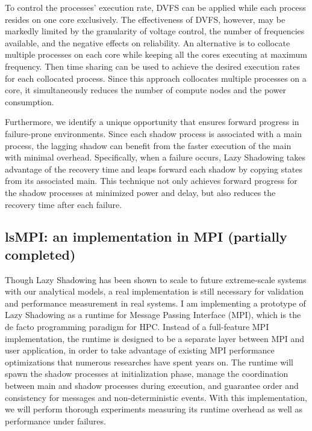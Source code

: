To control the processes' execution rate, DVFS can be applied while each process resides on one core exclusively. 
The effectiveness of DVFS, however, may be markedly 
limited by the granularity of voltage control, the number of frequencies available, and the negative effects on 
reliability. 
An alternative is to collocate multiple processes on each core while keeping all the cores executing at maximum frequency. 
Then time sharing can be used to achieve the desired execution rates for each collocated process. 
Since this approach collocates multiple processes on a core, it simultaneously reduces the number of compute nodes and 
the power consumption. 

Furthermore, we identify a unique opportunity that ensures forward progress in failure-prone environments. Since each shadow process is associated with a main process, the lagging shadow can benefit from the faster execution 
of the main with minimal overhead. Specifically, when a failure occurs, Lazy Shadowing takes advantage of 
the recovery time and leaps forward each shadow by copying states from its associated main. This technique not only achieves forward 
progress for the shadow processes at minimized power and delay, but also reduces the recovery time after each failure.

\subsection{lsMPI: an implementation in MPI (partially completed)}

Though Lazy Shadowing has been shown to scale to future extreme-scale systems with our analytical models, a real implementation 
is still necessary for validation and performance measurement in real systems. I am implementing a prototype of Lazy 
Shadowing as a runtime for Message Passing Interface (MPI), which is the de facto programming paradigm for HPC. Instead of 
a full-feature MPI implementation, the runtime is designed to be a separate layer between MPI and user application, in order 
to take advantage of existing MPI performance optimizations that numerous researches have spent years on. The runtime will spawn 
the shadow processes at initialization phase, manage the coordination between main and shadow processes during execution, 
and guarantee order and consistency for messages and non-deterministic events. With this implementation, we will perform thorough 
experiments measuring its runtime overhead as well as performance under failures.

